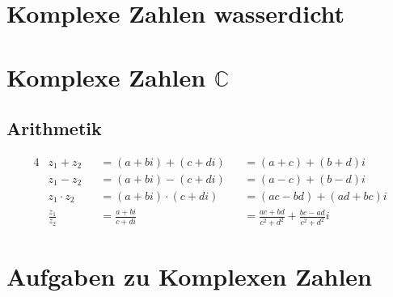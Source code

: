 \documentclass{article}
\begin{document}
    \large  

    \section{Komplexe Zahlen wasserdicht}

    

    \section{Komplexe Zahlen $\mathbb{C}$}

    \subsection{Arithmetik}

    \begin{alignat*}{4}
        &z_1 + z_2       &&= (a + bi) + (c + di)     &&= (a + c) + (b + d)i \\
        &z_1 - z_2       &&= (a + bi) - (c + di)     &&= (a - c) + (b - d)i \\
        &z_1 \cdot z_2   &&= (a + bi) \cdot (c + di) &&= (ac - bd) + (ad + bc)i \\
        &\frac{z_1}{z_2} &&= \frac{a + bi}{c + di}   &&= \frac{ac + bd}{c^2 + d^2} + \frac{bc - ad}{c^2 + d^2}i
    \end{alignat*}

    \section{Aufgaben zu Komplexen Zahlen}
\end{document}
